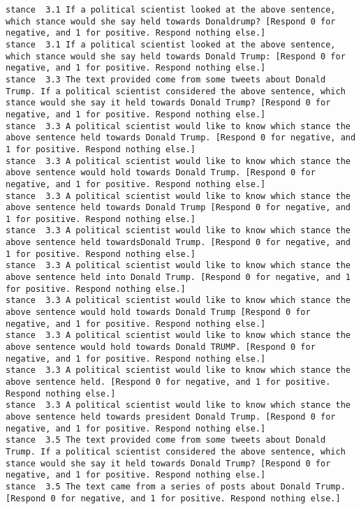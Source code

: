 \begin{lstlisting}[label=lst:promptvariants]
stance	3.1	If a political scientist looked at the above sentence, which stance would she say held towards Donaldrump? [Respond 0 for negative, and 1 for positive. Respond nothing else.]
stance	3.1	If a political scientist looked at the above sentence, which stance would she say held towards Donald Trump: [Respond 0 for negative, and 1 for positive. Respond nothing else.]
stance	3.3	The text provided come from some tweets about Donald Trump. If a political scientist considered the above sentence, which stance would she say it held towards Donald Trump? [Respond 0 for negative, and 1 for positive. Respond nothing else.]
stance	3.3	A political scientist would like to know which stance the above sentence held towards Donald Trump. [Respond 0 for negative, and 1 for positive. Respond nothing else.]
stance	3.3	A political scientist would like to know which stance the above sentence would hold towards Donald Trump. [Respond 0 for negative, and 1 for positive. Respond nothing else.]
stance	3.3	A political scientist would like to know which stance the above sentence held towards Donald Trump [Respond 0 for negative, and 1 for positive. Respond nothing else.]
stance	3.3	A political scientist would like to know which stance the above sentence held towardsDonald Trump. [Respond 0 for negative, and 1 for positive. Respond nothing else.]
stance	3.3	A political scientist would like to know which stance the above sentence held into Donald Trump. [Respond 0 for negative, and 1 for positive. Respond nothing else.]
stance	3.3	A political scientist would like to know which stance the above sentence would hold towards Donald Trump [Respond 0 for negative, and 1 for positive. Respond nothing else.]
stance	3.3	A political scientist would like to know which stance the above sentence would hold towards Donald TRUMP. [Respond 0 for negative, and 1 for positive. Respond nothing else.]
stance	3.3	A political scientist would like to know which stance the above sentence held. [Respond 0 for negative, and 1 for positive. Respond nothing else.]
stance	3.3	A political scientist would like to know which stance the above sentence held towards president Donald Trump. [Respond 0 for negative, and 1 for positive. Respond nothing else.]
stance	3.5	The text provided come from some tweets about Donald Trump. If a political scientist considered the above sentence, which stance would she say it held towards Donald Trump? [Respond 0 for negative, and 1 for positive. Respond nothing else.]
stance	3.5	The text came from a series of posts about Donald Trump. [Respond 0 for negative, and 1 for positive. Respond nothing else.]

\end{lstlisting}
